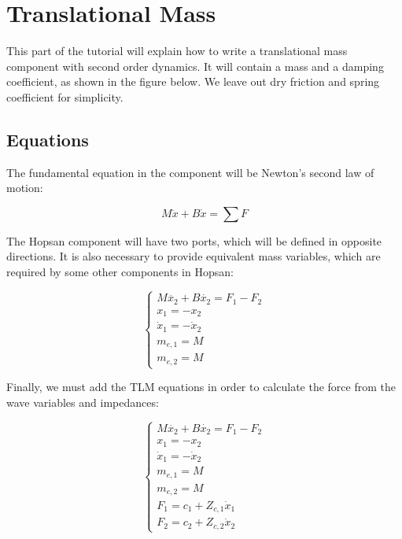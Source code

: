 \documentclass[a4paper,pdftex]{article}
\begin{document}
\vfill

\section*{Translational Mass}
This part of the tutorial will explain how to write a translational mass component with second order dynamics. It will contain a mass and a damping coefficient, as shown in the figure below. We leave out dry friction and spring coefficient for simplicity.


\subsection*{Equations}

The fundamental equation in the component will be Newton's second law of motion:

\begin{equation*}
M\ddot{x} + B\dot{x} = \sum{F}
\end{equation*}

\noindent The Hopsan component will have two ports, which will be defined in opposite directions. It is also necessary to provide equivalent mass variables, which are required by some other components in Hopsan:

\begin{equation*}
\begin{cases}
M\ddot{x_{2}} + B\dot{x_{2}} = F_{1} - F_{2}\\
x_{1} = -x_{2} \\
\dot{x}_{1} = -\dot{x}_{2} \\
m_{e,1} = M \\
m_{e,2} = M
\end{cases}
\end{equation*}

\noindent Finally, we must add the TLM equations in order to calculate the force from the wave variables and impedances:

\begin{equation*}
\begin{cases}
M\ddot{x_{2}} + B\dot{x_{2}} = F_{1} - F_{2}\\
x_{1} = -x_{2} \\
\dot{x}_{1} = -\dot{x}_{2} \\
m_{e,1} = M \\
m_{e,2} = M \\
F_{1} = c_{1} + Z_{c,1}\dot{x}_{1} \\
F_{2} = c_{2} + Z_{c,2}\dot{x}_{2} 
\end{cases}
\end{equation*}
\end{document}
